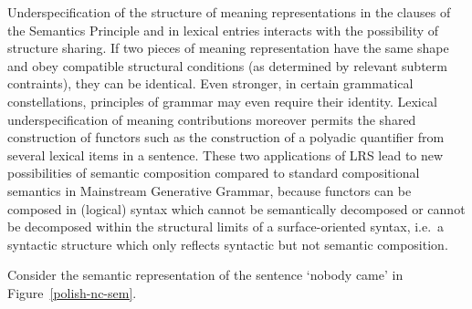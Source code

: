 \documentclass[output=paper
	        ,collection
	        ,collectionchapter
 	        ,biblatex
                ,babelshorthands
                ,newtxmath
                ,draftmode
                ,colorlinks, citecolor=brown
]{langscibook}
\begin{document}
Underspecification of the structure of meaning representations in the
clauses of the Semantics Principle and in lexical entries interacts
with the possibility of structure sharing. If two pieces of meaning
representation have the same shape and obey compatible structural
conditions (as determined by relevant subterm contraints), they can be
identical. Even stronger, in certain grammatical constellations,
principles of grammar may even require their
identity. Lexical underspecification of meaning contributions moreover
permits the shared construction of functors such as the construction
of a polyadic quantifier from several lexical items in a
sentence. These two applications of LRS lead to new possibilities
of semantic composition compared to standard compositional semantics
in Mainstream Generative Grammar, because functors can be composed in (logical) syntax
which cannot be semantically decomposed or cannot be decomposed within
the structural limits of a surface-oriented syntax, i.e.\ a syntactic
structure which only reflects syntactic but not semantic composition.





Consider the semantic representation of the  sentence  `nobody came' in Figure~\ref{polish-nc-sem}. 

\end{document}
